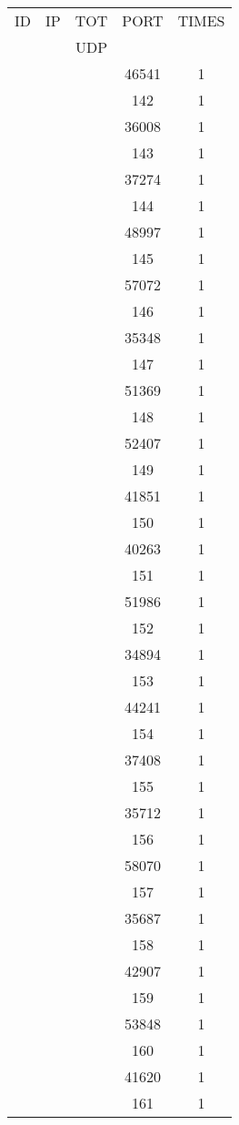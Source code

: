 \documentclass[a4paper]{scrartcl}
\begin{document}
\begin{minipage}[b]{0.5\linewidth}
\begin{tabular}{| c | c | c | c | c |}
\hline
ID & IP & TOT & PORT & TIMES \\ 
   &    & UDP &      &       \\ 
\hline
& & & 46541 & 1 \\ & & & 142 & 1 \\ & & & 36008 & 1 \\ & & & 143 & 1 \\ & & & 37274 & 1 \\ & & & 144 & 1 \\ & & & 48997 & 1 \\ & & & 145 & 1 \\ & & & 57072 & 1 \\ & & & 146 & 1 \\ & & & 35348 & 1 \\ & & & 147 & 1 \\ & & & 51369 & 1 \\ & & & 148 & 1 \\ & & & 52407 & 1 \\ & & & 149 & 1 \\ & & & 41851 & 1 \\ & & & 150 & 1 \\ & & & 40263 & 1 \\ & & & 151 & 1 \\ & & & 51986 & 1 \\ & & & 152 & 1 \\ & & & 34894 & 1 \\ & & & 153 & 1 \\ & & & 44241 & 1 \\ & & & 154 & 1 \\ & & & 37408 & 1 \\ & & & 155 & 1 \\ & & & 35712 & 1 \\ & & & 156 & 1 \\ & & & 58070 & 1 \\ & & & 157 & 1 \\ & & & 35687 & 1 \\ & & & 158 & 1 \\ & & & 42907 & 1 \\ & & & 159 & 1 \\ & & & 53848 & 1 \\ & & & 160 & 1 \\ & & & 41620 & 1 \\ & & & 161 & 1 \\ \hline\end{tabular}\end{minipage} \hfill\begin{minipage}[b]{0.5\linewidth}\begin{tabular}{| c | c | c | c | c |}

\end{tabular}
\end{minipage}
\end{document}
